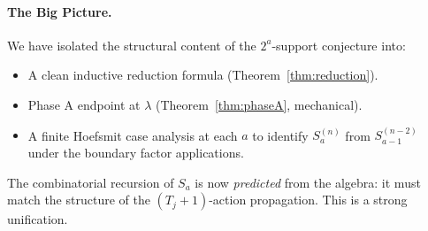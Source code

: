 \documentclass[11pt]{article}
\theoremstyle{definition}
\begin{document}
\paragraph{The Big Picture.}  We have isolated the structural
content of the $2^a$-support conjecture into:
\begin{itemize}[leftmargin=2em,topsep=0.3em,itemsep=0.2em]
\item A clean inductive reduction formula
(Theorem~\ref{thm:reduction}).
\item Phase A endpoint at $\lambda$ (Theorem~\ref{thm:phaseA},
mechanical).
\item A finite Hoefsmit case analysis at each $a$ to identify
$S_a^{(n)}$ from $S_{a-1}^{(n-2)}$ under the boundary factor
applications.
\end{itemize}
The combinatorial recursion of $S_a$ is now \emph{predicted} from
the algebra:  it must match the structure of the
$(T_j{+}1)$-action propagation.  This is a strong unification.
\end{document}
